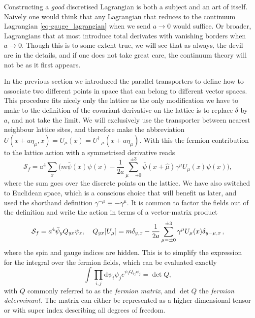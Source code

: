 Constructing a \emph{good} discretised Lagrangian is both a subject and an art
of itself. Naively one would think that any Lagrangian that reduces to the
continuum Lagrangian \eqref{eq-gauge_lagrangian} when we send $a \to 0$ would
suffice. Or broader, Lagrangians that at most introduce total derivates with 
vanishing borders when $a \to 0$. Though this is to some extent true, we will
see that as always, the devil are in the details, and if one does not take great
care, the continuum theory will not be as it first appears.

In the previous section we introduced the parallel transporters to define how to
associate two different points in space that can belong to different vector
spaces. This procedure fits nicely only the lattice as the only modification we
have to make to the definition of the covariant derivative on the lattice is to
replace $\delta$ by $a$, and not take the limit. We will exclusively use the
transporter between nearest neighbour lattice sites, and therefore make the
abbreviation $U(x + a \eta_\mu, x) = U_{\mu}(x) =
U_{-\mu}^{\dagger}(x+a\eta_{\mu})$. With this the fermion contribution to the
lattice action with a symmetrised derivative reads
%
\begin{equation} \label{eq-naive_fermions}
  \mathcal{S}_f = a^4 \sum_x \Big( 
    m \bar{\psi}(x)\psi(x) - 
    \frac{1}{2a}\sum_{\mu=\pm 0}^{\pm 3}
    \bar{\psi}(x+\hat{\mu})\gamma^{\mu}U_{\mu}(x) \psi(x) \bigg),
\end{equation}
%
where the sum goes over the discrete points on the lattice. We have also
switched to Euclidean space, which is a conscious choice that will benefit us
later, and used the shorthand definition $\gamma^{-\mu} \equiv -\gamma^{\mu}$.
It is common to factor the fields out of the definition and write the action in
terms of a vector-matrix product
%
\begin{equation}
  \mathcal{S}_f = a^4 \bar{\psi}_y Q_{yx} \psi_x, \hskip1em 
  Q_{yx}[U_{\mu}] = m \delta_{y,x} - \frac{1}{2a} \sum_{\mu=\pm 0}^{\pm 3} \gamma^{\mu}
    U_{\mu}(x) \delta_{y-\mu,x} \,,
\end{equation}
%
where the spin and gauge indices are hidden.  This is to simplify the expression
for the integral over the fermion fields, which can be evaluated exactly
%
\begin{equation} \label{eq-fermion-integral}
  \int \prod_{i,j} \mathrm{d} \bar{\psi}_i \psi_j e^{\bar{\psi}_i Q_{ij} \psi_j}
   = \det Q,
\end{equation}
%
with $Q$ commonly referred to as the \emph{fermion matrix}, and $\det Q$ the
\emph{fermion determinant}. The matrix can either be represented as a higher
dimensional tensor or with super index describing all degrees of freedom.

